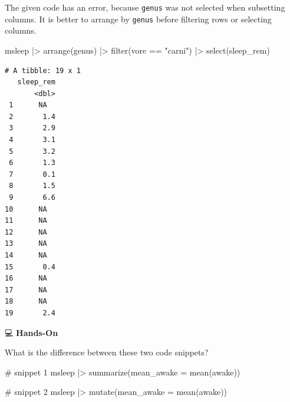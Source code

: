 \documentclass[
  letterpaper,
  DIV=11,
  numbers=noendperiod]{scrreprt}
\newenvironment{Shaded}{\begin{snugshade}}{\end{snugshade}}
\newcommand{\AttributeTok}[1]{\textcolor[rgb]{0.40,0.45,0.13}{#1}}
\newcommand{\CommentTok}[1]{\textcolor[rgb]{0.37,0.37,0.37}{#1}}
\newcommand{\FunctionTok}[1]{\textcolor[rgb]{0.28,0.35,0.67}{#1}}
\newcommand{\NormalTok}[1]{\textcolor[rgb]{0.00,0.23,0.31}{#1}}
\newcommand{\SpecialCharTok}[1]{\textcolor[rgb]{0.37,0.37,0.37}{#1}}
\newcommand{\StringTok}[1]{\textcolor[rgb]{0.13,0.47,0.30}{#1}}
\begin{document}
\begin{tcolorbox}[enhanced jigsaw, colbacktitle=quarto-callout-tip-color!10!white, opacitybacktitle=0.6, breakable, left=2mm, leftrule=.75mm, toprule=.15mm, toptitle=1mm, bottomtitle=1mm, colframe=quarto-callout-tip-color-frame, opacityback=0, coltitle=black, arc=.35mm, titlerule=0mm, colback=white, bottomrule=.15mm, title=\textcolor{quarto-callout-tip-color}{\faLightbulb}\hspace{0.5em}{Answer}, rightrule=.15mm]

The given code has an error, because \texttt{genus} was not selected
when subsetting columns. It is better to arrange by \texttt{genus}
before filtering rows or selecting columns.

\begin{Shaded}
\begin{Highlighting}[]
\NormalTok{msleep }\SpecialCharTok{|\textgreater{}}
  \FunctionTok{arrange}\NormalTok{(genus) }\SpecialCharTok{|\textgreater{}}
  \FunctionTok{filter}\NormalTok{(vore }\SpecialCharTok{==} \StringTok{"carni"}\NormalTok{) }\SpecialCharTok{|\textgreater{}}
  \FunctionTok{select}\NormalTok{(sleep\_rem)}
\end{Highlighting}
\end{Shaded}

\begin{verbatim}
# A tibble: 19 x 1
   sleep_rem
       <dbl>
 1      NA  
 2       1.4
 3       2.9
 4       3.1
 5       3.2
 6       1.3
 7       0.1
 8       1.5
 9       6.6
10      NA  
11      NA  
12      NA  
13      NA  
14      NA  
15       0.4
16      NA  
17      NA  
18      NA  
19       2.4
\end{verbatim}

\end{tcolorbox}

💻 \textbf{Hands-On}

What is the difference between these two code snippets?

\begin{Shaded}
\begin{Highlighting}[]
\CommentTok{\# snippet 1}
\NormalTok{msleep }\SpecialCharTok{|\textgreater{}}
  \FunctionTok{summarize}\NormalTok{(}\AttributeTok{mean\_awake =} \FunctionTok{mean}\NormalTok{(awake))}

\CommentTok{\# snippet 2}
\NormalTok{msleep }\SpecialCharTok{|\textgreater{}}
  \FunctionTok{mutate}\NormalTok{(}\AttributeTok{mean\_awake =} \FunctionTok{mean}\NormalTok{(awake))}
\end{Highlighting}
\end{Shaded}
\end{document}
